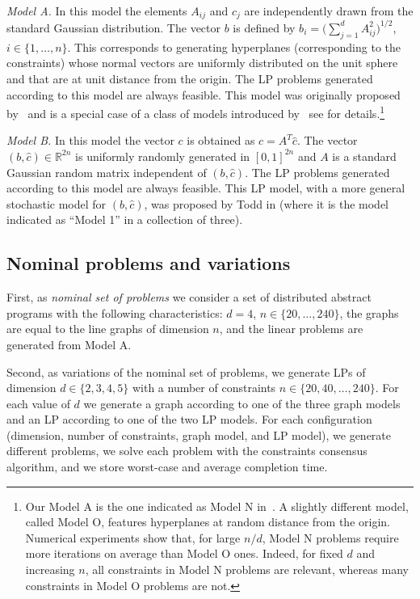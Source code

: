 \documentclass[onecolumn,journal,letterpaper]{IEEEtran}
\newcommand{\real}{{\mathbb{R}}}
\newcommand{\until}[1]{\{1,\dots,#1\}}
\begin{document}
\emph{Model A.} In this model the elements $A_{ij}$ and $c_j$ are
independently drawn from the standard Gaussian distribution. The vector $b$
is defined by $b_i = \big(\sum_{j=1}^d A^2_{ij}\big)^{1/2}$,
$i\in\until{n}$.  This corresponds to generating hyperplanes (corresponding
to the constraints) whose normal vectors are uniformly distributed on the
unit sphere and that are at unit distance from the origin. The LP problems
generated according to this model are always feasible. This model was
originally proposed by~\cite{JRD-DGK-JWT:77} and is a special case of a
class of models introduced by~\cite{KHB:77} see \cite{RS:87} for
details.\footnote{Our Model A is the one indicated as Model N
  in~\cite{RS:87}.  A slightly different model, called Model O, features
  hyperplanes at random distance from the origin. Numerical experiments
  show that, for large $n/d$, Model N problems require more iterations on
  average than Model O ones. Indeed, for fixed $d$ and increasing $n$, all
  constraints in Model N problems are relevant, whereas many constraints in
  Model O problems are not.}


\emph{Model B.} In this model the vector $c$ is obtained as $c = A^T
\hat{c}$. The vector $(b, \hat{c}) \in \real^{2n}$ is uniformly randomly
generated in $[0,1]^{2n}$ and $A$ is a standard Gaussian random matrix
independent of $(b, \hat{c})$.  The LP problems generated according to this
model are always feasible. This LP model, with a more general stochastic
model for $(b, \hat{c})$, was proposed by Todd in \cite{MJT:91} (where it
is the model indicated as ``Model 1'' in a collection of three).


\subsection{Nominal problems and variations}
First, as \emph{nominal set of problems} we consider a set of distributed
abstract programs with the following characteristics: $d=4$,
$n\in\{20,\dots,240\}$, the graphs are equal to the line graphs of
dimension $n$, and the linear problems are generated from Model A.

Second, as variations of the nominal set of problems, we generate LPs of
dimension $d\in\{2,3,4,5\}$ with a number of constraints
$n\in\{20,40,\dots,240\}$. For each value of $d$ we generate a graph
according to one of the three graph models and an LP according to one of
the two LP models. For each configuration (dimension, number of
constraints, graph model, and LP model), we generate different problems, we
solve each problem with the constraints consensus algorithm, and we store
worst-case and average completion time.
\end{document}
